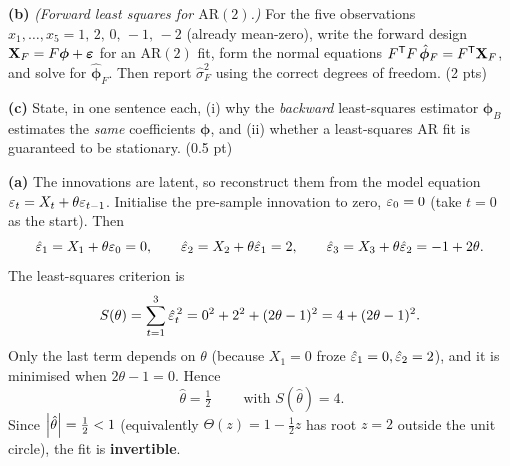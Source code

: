 \documentclass[11pt]{article}
\begin{document}
\textbf{(b)} \emph{(Forward least squares for $\mathrm{AR}(2)$.)} For the five observations $x_1,\dots,x_5=1,\,2,\,0,\,-1,\,-2$ (already mean-zero), write the forward design $\mathbf X_F=F\boldsymbol\phi+\boldsymbol{\varepsilon}$ for an $\mathrm{AR}(2)$ fit, form the normal equations $F^{\mathsf{T}} F\,\hat{\boldsymbol\phi}_F=F^{\mathsf{T}}\mathbf X_F$, and solve for $\hat{\boldsymbol\phi}_F$. Then report $\hat\sigma_F^2$ using the correct degrees of freedom. \hfill(2 pts)

\textbf{(c)} State, in one sentence each, (i) why the \emph{backward} least-squares estimator $\hat{\boldsymbol\phi}_B$ estimates the \emph{same} coefficients $\boldsymbol\phi$, and (ii) whether a least-squares AR fit is guaranteed to be stationary. \hfill(0.5 pt)
\statementend

\textbf{(a)} The innovations are latent, so reconstruct them from the model
equation $\varepsilon_t=X_t+\theta\varepsilon_{t-1}$. Initialise the pre-sample innovation to
zero, $\varepsilon_0=0$ (take $t=0$ as the start). Then
\[
\hat{\varepsilon}_1=X_1+\theta\varepsilon_0=0,\qquad
\hat{\varepsilon}_2=X_2+\theta\hat{\varepsilon}_1=2,\qquad
\hat{\varepsilon}_3=X_3+\theta\hat{\varepsilon}_2=-1+2\theta .
\]
The least-squares criterion is
\[
S(\theta)=\sum_{t=1}^3\hat{\varepsilon}_t^{\,2}=0^2+2^2+(2\theta-1)^2=4+(2\theta-1)^2 .
\]
Only the last term depends on $\theta$ (because $X_1=0$ froze
$\hat{\varepsilon}_1=0,\hat{\varepsilon}_2=2$), and it is minimised when $2\theta-1=0$. Hence
\[
\boxed{\;\hat\theta=\tfrac12\;}\qquad\text{with } S(\hat\theta)=4 .
\]
Since $\left\lvert \hat\theta \right\rvert=\tfrac12<1$ (equivalently $\Theta(z)=1-\tfrac12 z$ has
root $z=2$ outside the unit circle), the fit is \textbf{invertible}.
\end{document}
